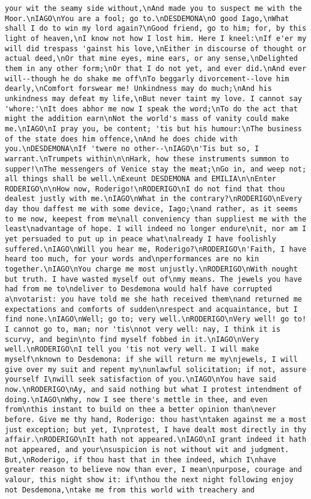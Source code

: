 \begin{verbatim}
your wit the seamy side without,\nAnd made you to suspect me with the Moor.\nIAGO\nYou are a fool; go to.\nDESDEMONA\nO good Iago,\nWhat shall I do to win my lord again?\nGood friend, go to him; for, by this light of heaven,\nI know not how I lost him. Here I kneel:\nIf e'er my will did trespass 'gainst his love,\nEither in discourse of thought or actual deed,\nOr that mine eyes, mine ears, or any sense,\nDelighted them in any other form;\nOr that I do not yet, and ever did.\nAnd ever will--though he do shake me off\nTo beggarly divorcement--love him dearly,\nComfort forswear me! Unkindness may do much;\nAnd his unkindness may defeat my life,\nBut never taint my love. I cannot say 'whore:'\nIt does abhor me now I speak the word;\nTo do the act that might the addition earn\nNot the world's mass of vanity could make me.\nIAGO\nI pray you, be content; 'tis but his humour:\nThe business of the state does him offence,\nAnd he does chide with you.\nDESDEMONA\nIf 'twere no other--\nIAGO\n'Tis but so, I warrant.\nTrumpets within\n\nHark, how these instruments summon to supper!\nThe messengers of Venice stay the meat;\nGo in, and weep not; all things shall be well.\nExeunt DESDEMONA and EMILIA\n\nEnter RODERIGO\n\nHow now, Roderigo!\nRODERIGO\nI do not find that thou dealest justly with me.\nIAGO\nWhat in the contrary?\nRODERIGO\nEvery day thou daffest me with some device, Iago;\nand rather, as it seems to me now, keepest from me\nall conveniency than suppliest me with the least\nadvantage of hope. I will indeed no longer endure\nit, nor am I yet persuaded to put up in peace what\nalready I have foolishly suffered.\nIAGO\nWill you hear me, Roderigo?\nRODERIGO\n'Faith, I have heard too much, for your words and\nperformances are no kin together.\nIAGO\nYou charge me most unjustly.\nRODERIGO\nWith nought but truth. I have wasted myself out of\nmy means. The jewels you have had from me to\ndeliver to Desdemona would half have corrupted a\nvotarist: you have told me she hath received them\nand returned me expectations and comforts of sudden\nrespect and acquaintance, but I find none.\nIAGO\nWell; go to; very well.\nRODERIGO\nVery well! go to! I cannot go to, man; nor 'tis\nnot very well: nay, I think it is scurvy, and begin\nto find myself fobbed in it.\nIAGO\nVery well.\nRODERIGO\nI tell you 'tis not very well. I will make myself\nknown to Desdemona: if she will return me my\njewels, I will give over my suit and repent my\nunlawful solicitation; if not, assure yourself I\nwill seek satisfaction of you.\nIAGO\nYou have said now.\nRODERIGO\nAy, and said nothing but what I protest intendment of doing.\nIAGO\nWhy, now I see there's mettle in thee, and even from\nthis instant to build on thee a better opinion than\never before. Give me thy hand, Roderigo: thou hast\ntaken against me a most just exception; but yet, I\nprotest, I have dealt most directly in thy affair.\nRODERIGO\nIt hath not appeared.\nIAGO\nI grant indeed it hath not appeared, and your\nsuspicion is not without wit and judgment. But,\nRoderigo, if thou hast that in thee indeed, which I\nhave greater reason to believe now than ever, I mean\npurpose, courage and valour, this night show it: if\nthou the next night following enjoy not Desdemona,\ntake me from this world with treachery and 
\end{verbatim}
